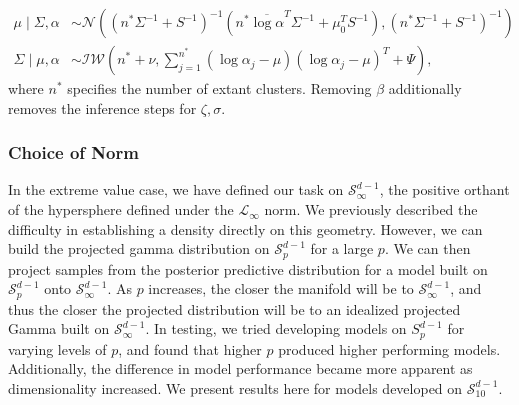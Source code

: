   \begin{equation}
    \begin{aligned}
    \mu\mid\Sigma,\alpha &\sim \mathcal{N}\left((n^*\Sigma^{-1} + S^{-1})^{-1}(n^*\overline{\log\alpha}^T\Sigma^{-1}
      + \mu_0^TS^{-1}),(n^{*}\Sigma^{-1} + S^{-1})^{-1}\right)\\
    \Sigma\mid\mu,\alpha &\sim \mathcal{IW}\left(
        n^* + \nu, {\textstyle\sum}_{j = 1}^{n^*}(\log\alpha_j - \mu)(\log\alpha_j - \mu)^T + \Psi\right),
    \end{aligned}
  \end{equation}
  where $n^*$ specifies the number of extant clusters.  Removing $\beta$ additionally removes the
  inference steps for $\zeta,\sigma$.

\subsubsection{Choice of Norm}
In the extreme value case, we have defined our task on $\mathcal{S}_{\infty}^{d-1}$, the positive orthant
  of the hypersphere defined under the $\mathcal{L}_{\infty}$ norm.  We previously described the
  difficulty in establishing a density directly on this geometry.  However, we can build the projected
  gamma distribution on $\mathcal{S}_p^{d-1}$ for a large $p$.  We can then project samples from the
  posterior predictive distribution for a model built on $\mathcal{S}_p^{d-1}$ onto
  $\mathcal{S}_{\infty}^{d-1}$. As $p$ increases, the closer the manifold will be to
  $\mathcal{S}_{\infty}^{d-1}$, and thus the closer the projected distribution will be to an idealized
  projected Gamma built on $\mathcal{S}_{\infty}^{d-1}$.  In testing, we tried developing models on
  $S_p^{d-1}$ for varying levels of $p$, and found that higher $p$ produced higher performing models.
  Additionally, the difference in model performance became more apparent as dimensionality increased.
  We present results here for models developed on $\mathcal{S}_{10}^{d-1}$.

